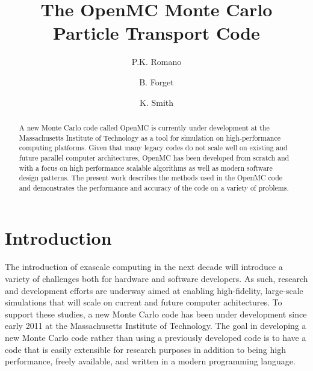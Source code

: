 \documentclass{elsarticle}
\begin{document}
\title{The OpenMC Monte Carlo Particle Transport Code}
\author[mit]{P.K. Romano}

\author[mit]{B. Forget}

\author[mit]{K. Smith}

\address[mit]{Massachusetts Institute of Technology, Department of Nuclear
  Science and Engineering, 77 Massachusetts Avenue, Building 24-213, Cambridge,
  MA 02141}

\begin{abstract}
A new Monte Carlo code called OpenMC is currently under development at the
Massachusetts Institute of Technology as a tool for simulation on
high-performance computing platforms. Given that many legacy codes do not scale
well on existing and future parallel computer architectures, OpenMC has been
developed from scratch and with a focus on high performance scalable algorithms
as well as modern software design patterns. The present work describes the
methods used in the OpenMC code and demonstrates the performance and accuracy of
the code on a variety of problems.
\end{abstract}

\maketitle

\section{Introduction}

The introduction of exascale computing in the next decade will introduce a
variety of challenges both for hardware and software developers. As such,
research and development efforts are underway aimed at enabling high-fidelity,
large-scale simulations that will scale on current and future computer
achitectures. To support these studies, a new Monte Carlo code has been under
development since early 2011 at the Massachusetts Institute of Technology. The
goal in developing a new Monte Carlo code rather than using a previously
developed code is to have a code that is easily extensible for research purposes
in addition to being high performance, freely available, and written in a modern
programming language.
\end{document}
